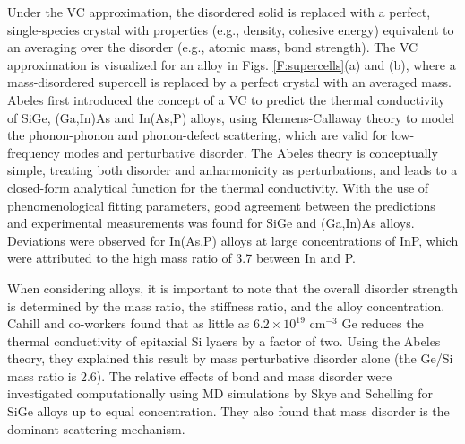 \documentclass[aps,prb,onecolumn,preprint,footinbib,superscriptaddress,amsmath,amssymb,floatfix]{revtex4}
\begin{document}
Under the VC approximation, the disordered solid is replaced with 
a perfect, single-species crystal with properties (e.g., density, 
cohesive energy) equivalent to an averaging over the disorder 
(e.g., atomic mass, bond strength).\cite{abeles_lattice_1963}
The VC approximation is visualized for an alloy in Figs. 
\ref{F:supercells}(a) and (b), where 
a mass-disordered supercell is replaced by a perfect 
crystal with an averaged mass. 
Abeles first introduced the concept of a VC to predict the
thermal conductivity of SiGe, (Ga,In)As and In(As,P) alloys,
\cite{abeles_lattice_1963} using  
Klemens-Callaway theory to model the phonon-phonon and phonon-defect 
scattering, 
which are valid for low-frequency modes and  
perturbative disorder.
\cite{abeles_lattice_1963,klemens_scattering_1955,
klemens_thermal_1957,callaway_model_1959,mattis_phonon_1957,
kamitakahara_vibrations_1974} 
The Abeles theory is conceptually simple, treating both
disorder and anharmonicity as perturbations, and leads to 
a closed-form analytical function for the thermal conductivity.
With the use of phenomenological  
fitting parameters, good agreement between the predictions and 
experimental measurements 
was found for SiGe and (Ga,In)As alloys. Deviations were observed 
for In(As,P) alloys at large concentrations of 
InP, which were attributed to the high mass ratio of 3.7 between 
In and P.\cite{abeles_lattice_1963}

When considering alloys, it is important to note that 
the overall disorder strength is determined by the mass ratio, 
the stiffness ratio, and the alloy concentration.
Cahill and co-workers found that as little as 
$6.2\times10^{19}$ cm$^{-3}$ Ge reduces the thermal conductivity of 
epitaxial Si lyaers by a factor of two.\cite{cahill_thermal_2004}  
Using the Abeles theory, they explained this result 
by mass perturbative disorder alone (the Ge/Si mass ratio is 2.6).
\cite{cahill_thermal_2004,cahill_thermal_2005} 
The relative effects of bond and mass disorder were investigated 
computationally using MD simulations by Skye and 
Schelling for SiGe alloys up to equal concentration.
\cite{skye_thermal_2008} They also found that mass disorder is 
the dominant scattering mechanism. 
\end{document}

